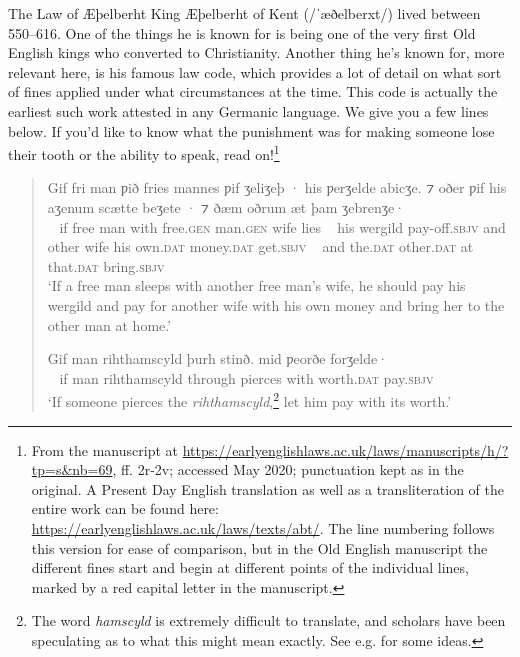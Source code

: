 \begin{texts}{The Law of Æþelberht}
King Æþelberht of Kent (/ˈæðelberxt/) lived between 550--616. One of the things he is known for is being one of the very first Old English kings who converted to Christianity. Another thing he's known for, more relevant here, is his famous law code, which provides a lot of detail on what sort of fines applied under what circumstances at the time. This code is actually the earliest such work attested in any Germanic language. We give you a few lines below. If you'd like to know what the punishment was for making someone lose their tooth or the ability to speak, read on!\footnote{From the manuscript at \url{https://earlyenglishlaws.ac.uk/laws/manuscripts/h/?tp=s&nb=69}, ff. 2r-2v; accessed May 2020; punctuation kept as in the original. A Present Day English translation as well as a transliteration of the entire work can be found here: \url{https://earlyenglishlaws.ac.uk/laws/texts/abt/}. The line numbering follows this version for ease of comparison, but in the Old English manuscript the different fines start and begin at different points of the individual lines, marked by a red capital letter in the manuscript.}

\begin{quote}
     Gif fri man ƿið fries mannes ƿif ʒeliʒeþ · his ƿerʒelde abicʒe. ⁊ oðer ƿif his aʒenum scætte beʒete · ⁊ ðæm oðrum æt þam ʒebrenʒe·\\
    ~ if free man with free.\textsc{gen} man.\textsc{gen} wife lies ~ his wergild pay-off.\textsc{sbjv} and other wife his own.\textsc{dat} money.\textsc{dat} get.\textsc{sbjv} ~ and the.\textsc{dat} other.\textsc{dat} at that.\textsc{dat} bring.\textsc{sbjv}\\\newline
    \trans `If a free man sleeps with another free man's wife, he should pay his wergild and pay for another wife with his own money and bring her to the other man at home.'
    
     Gif man rihthamscyld þurh stinð. mid ƿeorðe forʒelde·\\
    ~ if man rihthamscyld through pierces with worth.\textsc{dat} pay.\textsc{sbjv}\\\newline
    \trans `If someone pierces the \emph{rihthamscyld},\footnote{The word \textit{hamscyld} is extremely difficult to translate, and scholars have been speculating as to what this might mean exactly. See e.g. \citet{Ammon2002} for some ideas.} let him pay with its worth.'
    

\end{quote}
\end{texts}
